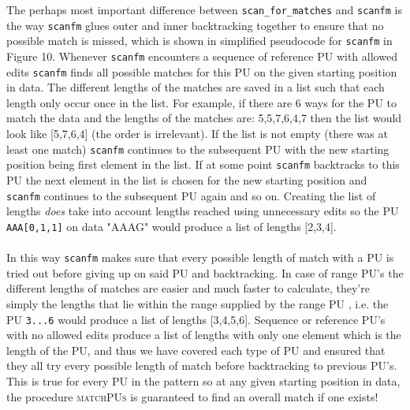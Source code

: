 \documentclass[12pt]{article}
\newcommand{\scm}{\texttt{scan\_for\_matches} }
\newcommand{\sfm}{\texttt{scanfm} }
\newcommand{\pu}{PU }
\newcommand{\pus}{PU's }
\newcommand{\pusp}{PU's. }
\begin{document}
The perhaps most important difference between \scm and \sfm is the way \sfm glues outer and inner backtracking together
to ensure that no possible match is missed, which is shown in simplified pseudocode for \sfm in Figure 10.
Whenever \sfm encounters a sequence of reference \pu with allowed edits
\sfm finds all possible matches for this \pu on the given starting position in data. The different
lengths of the matches are saved in a list such that each length only occur once in the list. For example, if 
there are 6 ways for the \pu to match the data and the lengths of the matches are: 5,5,7,6,4,7 then the list would
look like [5,7,6,4] (the order is irrelevant). If the list is not empty (there was at least one match)
\sfm continues to the subsequent \pu with the new starting position being first element in the list. If at some
point \sfm backtracks to this \pu the next element in the list is chosen for the new starting position and \sfm
continues to the subsequent \pu again and so on. Creating the list of lengths \emph{does} take into account lengths reached using
unnecessary edits so the \pu \texttt{AAA[0,1,1]} on data "AAAG" would produce a list of lengths [2,3,4]. \\ \\
In this way \sfm makes sure that every possible length of match with a \pu is tried out before giving up on said \pu
and backtracking. In case of range \pus the different lengths of matches are easier and much faster to calculate, 
they're simply the lengths that lie within the range supplied by the range \pu, i.e. the \pu \texttt{3...6}
would produce a list of lengths [3,4,5,6]. Sequence or reference \pus with no allowed edits produce a list
of lengths with only one element which is the length of the PU, and thus we have covered each type of \pu and ensured
that they all try every possible length of match before backtracking to previous \pusp This is true for every
\pu in the pattern so at any given starting position in data, the procedure \textsc{\small matchPUs} is
guaranteed to find an overall match if one exists!
\end{document}
